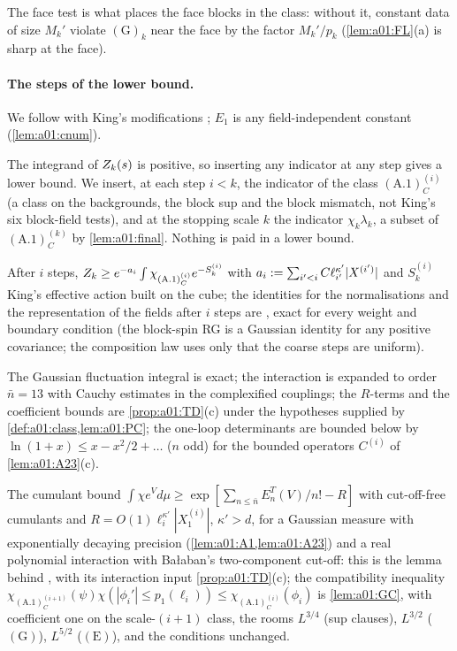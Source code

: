 The face test is what places the face blocks in the class: without it, constant data of size $M_k'$ violate $(\mathrm G)_k$ near the face by the factor $M_k'/p_k$ (\cref{lem:a01:FL}(a) is sharp at the face).

\paragraph{The steps of the lower bound.} We follow \cite[Sect.~3]{Ba1} with King's modifications \cite[Appendix, p.~676]{K1}; $E_1$ is any field-independent constant (\cref{lem:a01:cnum}).
\begin{description}[leftmargin=1.5em,style=nextline]
\item[{B1 (restriction to small fields; \cite[(3.6)]{Ba1})}] The integrand of $Z_{k}(s)$ is positive, so inserting any indicator at any step gives a lower bound. We insert, at each step $i<k$, the indicator of the class $(\mathrm{A.1})^{(i)}_C$ (a class on the backgrounds, the block sup and the block mismatch, not King's six block-field tests), and at the stopping scale $k$ the indicator $\chi_k\lambda_k$, a subset of $(\mathrm{A.1})^{(k)}_C$ by \cref{lem:a01:final}. Nothing is paid in a lower bound.
\item[{B2 (inductive hypothesis; \cite[(3.26)--(3.32)]{Ba1})}] After $i$ steps, $Z_{k}\ge e^{-a_i}\int\chi_{(\mathrm{A.1})^{(i)}_C}e^{-S^{(i)}_k}$ with $a_i:=\sum_{i'<i}C\ell_{i'}^{\kappa'}|X^{(i')}|$ and $S^{(i)}_k$ King's effective action \cite[(3.14)]{K1} built on the cube; the identities for the normalisations and the representation of the fields after $i$ steps are \cite[(2.13)--(2.17)]{K1}, exact for every weight and boundary condition (the block-spin RG is a Gaussian identity for any positive covariance; the composition law uses only that the coarse steps are uniform).
\item[{B3 (the fluctuation step; \cite[(3.37)--(3.49), Props.~3.1--3.2]{Ba1})}] The Gaussian fluctuation integral is exact; the interaction is expanded to order $\bar n=13$ \cite[Appendix]{K1} with Cauchy estimates in the complexified couplings; the $R$-terms and the coefficient bounds are \cref{prop:a01:TD}(c) under the hypotheses supplied by \cref{def:a01:class,lem:a01:PC}; the one-loop determinants are bounded below by $\ln(1+x)\le x-x^2/2+\dots$ ($n$ odd) for the bounded operators $C^{(i)}$ of \cref{lem:a01:A23}(c).
\item[{B4 (cut-off removal and the consistency conditions; \cite[(3.50)--(3.55)]{Ba1})}] The cumulant bound $\int\chi e^Vd\mu\ge\exp[\sum_{n\le\bar n}E^T_n(V)/n!-R]$ with cut-off-free cumulants and $R=O(1)\ell_i^{\kappa'}|X^{(i)}_1|$, $\kappa'>d$, for a Gaussian measure with exponentially decaying precision (\cref{lem:a01:A1,lem:a01:A23}) and a real polynomial interaction with Ba{\l}aban's two-component cut-off: this is the lemma behind \cite[Prop.~3.2]{Ba1}, with its interaction input \cref{prop:a01:TD}(c); the compatibility inequality $\chi_{(\mathrm{A.1})^{(i+1)}_C}(\psi)\chi(|\phi_i'|\le p_1(\ell_i))\le\chi_{(\mathrm{A.1})^{(i)}_C}(\phi_i)$ is \cref{lem:a01:GC}, with coefficient one on the scale-$(i+1)$ class, the rooms $L^{3/4}$ (sup clauses), $L^{3/2}$ ($(\mathrm G)$), $L^{5/2}$ ($(\mathrm E)$), and the conditions \cite[(3.54)]{Ba1} unchanged.

\end{description}

